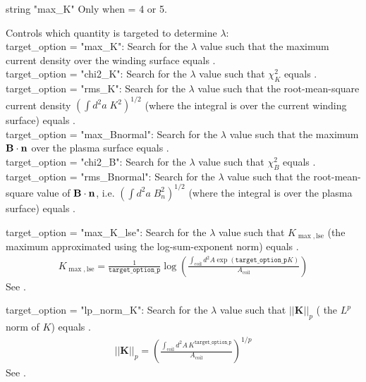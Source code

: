\myhrule

{string}
{{\ttfamily "max\_K"}}
{Only when  = 4 or 5.}
{Controls which quantity is targeted to determine $\lambda$:\\

{\ttfamily target\_option = "max\_K"}: Search for the $\lambda$ value such that the maximum
current density over the winding surface equals .\\

{\ttfamily target\_option = "chi2\_K"}: Search for the $\lambda$ value such that $\chi^2_K$ equals .\\

{\ttfamily target\_option = "rms\_K"}: Search for the $\lambda$ value such that the root-mean-square current density
$\left( \int d^2a\; K^2 \right)^{1/2}$ (where the integral is over the current winding surface) equals .\\

{\ttfamily target\_option = "max\_Bnormal"}: Search for the $\lambda$ value such that the maximum
${\mathbf B}\cdot{\mathbf n}$ over the plasma surface equals .\\

{\ttfamily target\_option = "chi2\_B"}: Search for the $\lambda$ value such that $\chi^2_B$ equals .\\

{\ttfamily target\_option = "rms\_Bnormal"}: Search for the $\lambda$ value such that the root-mean-square value of ${\mathbf B}\cdot{\mathbf n}$, i.e.
$\left( \int d^2a\; B_n^2 \right)^{1/2}$ (where the integral is over the plasma surface) equals .

{\ttfamily target\_option = "max\_K\_lse"}: Search for the $\lambda$ value such that $K_{\max,\text{lse}}$ (the maximum approximated using the log-sum-exponent norm) equals .
\begin{gather}
K_{\max,\text{lse}} = \frac{1}{\texttt{target\_option\_p}} \log \left( \frac{\int_{\text{coil}} d^2 A \exp \left( \texttt{target\_option\_p}K \right)}{A_{\text{coil}}} \right)
\end{gather}
See .

{\ttfamily target\_option = "lp\_norm\_K"}: Search for the $\lambda$ value such that $|| \bm{K} ||_p$ ( the $L^p$ norm of $K$) equals .
\begin{gather}
|| {\bm{K}} ||_p = \left( \frac{\int_{\text{coil}} d^2 A \, K^{\texttt{target\_option\_p}} }{A_{\text{coil}}} \right)^{1/p}
\end{gather}
See .

}

